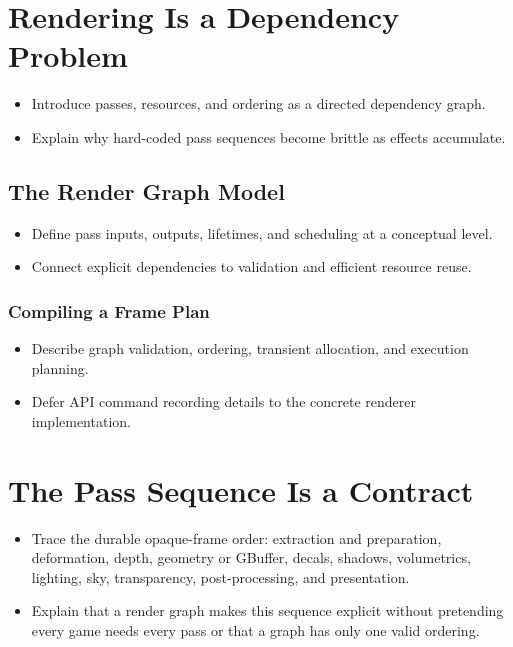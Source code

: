 \documentclass[
  11pt,
  letterpaper,
  DIV=11,
  numbers=noendperiod,
  twoside,
  open=right]{scrreprt}
\providecommand{\tightlist}{%
  \setlength{\itemsep}{0pt}\setlength{\parskip}{0pt}}
\begin{document}
\section{Rendering Is a Dependency
Problem}\label{rendering-is-a-dependency-problem}

\begin{itemize}
\tightlist
\item
  Introduce passes, resources, and ordering as a directed dependency
  graph.
\item
  Explain why hard-coded pass sequences become brittle as effects
  accumulate.
\end{itemize}

\subsection{The Render Graph Model}\label{the-render-graph-model}

\begin{itemize}
\tightlist
\item
  Define pass inputs, outputs, lifetimes, and scheduling at a conceptual
  level.
\item
  Connect explicit dependencies to validation and efficient resource
  reuse.
\end{itemize}

\subsubsection{Compiling a Frame Plan}\label{compiling-a-frame-plan}

\begin{itemize}
\tightlist
\item
  Describe graph validation, ordering, transient allocation, and
  execution planning.
\item
  Defer API command recording details to the concrete renderer
  implementation.
\end{itemize}

\section{The Pass Sequence Is a
Contract}\label{the-pass-sequence-is-a-contract}

\begin{itemize}
\tightlist
\item
  Trace the durable opaque-frame order: extraction and preparation,
  deformation, depth, geometry or GBuffer, decals, shadows, volumetrics,
  lighting, sky, transparency, post-processing, and presentation.
\item
  Explain that a render graph makes this sequence explicit without
  pretending every game needs every pass or that a graph has only one
  valid ordering.
\end{itemize}
\end{document}
